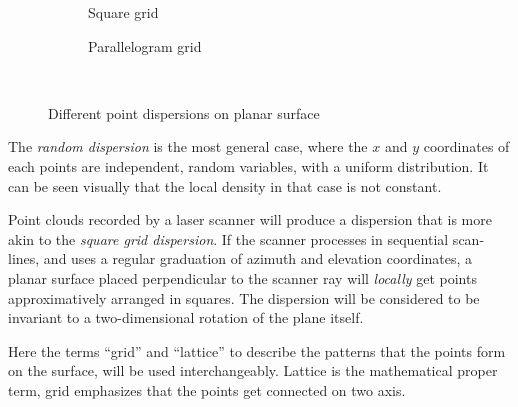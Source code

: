\begin{figure}[H]
\begin{subfigure}{.3\textwidth}
{	\caption{Square grid}
}
\end{subfigure}%
\hfill%
\begin{subfigure}{.3\textwidth}
{
	\setlength{\fboxsep}{0pt}%
	\setlength{\fboxrule}{0.5pt}%
	\caption{Parallelogram grid}
}%
\end{subfigure}\\
\caption{Different point dispersions on planar surface}
\label{fig:point_dispersion}
\end{figure}

The \emph{random dispersion} is the most general case, where the $x$ and $y$ coordinates of each points are independent, random variables, with a uniform distribution. It can be seen visually that the local density in that case is not constant.

Point clouds recorded by a laser scanner will produce a dispersion that is more akin to the \emph{square grid dispersion}. If the scanner processes in sequential scan-lines, and uses a regular graduation of azimuth and elevation coordinates, a planar surface placed perpendicular to the scanner ray will \emph{locally} get points approximatively arranged in squares. The dispersion will be considered to be invariant to a two-dimensional rotation of the plane itself.

Here the terms ``grid'' and ``lattice'' to describe the patterns that the points form on the surface, will be used interchangeably. Lattice is the mathematical proper term, grid emphasizes that the points get connected on two axis.

